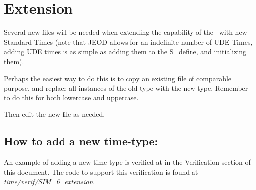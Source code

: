 %
%
% 
%

 \section{Extension}\label{sec:User_Extension}

Several new files will be needed when extending the capability of the
\timeDesc\ with new Standard Times (note that JEOD allows for an
indefinite number of UDE Times, adding UDE times is as simple as adding
them to the S\_define, and initializing them).

Perhaps the easiest way to do this is to copy an existing file of
comparable purpose, and replace all instances of the old type with the
new type.  Remember to do this for both lowercase and uppercase.

Then edit the new file as needed.

\subsection{How to add a new time-type:}
\label{ref:Howtoaddanewtimetype}

An example of adding a new time type is verified at
 in the Verification section of this
document.  The code to support this verification is found at
\textit{time/verif/SIM\_6\_extension}.

